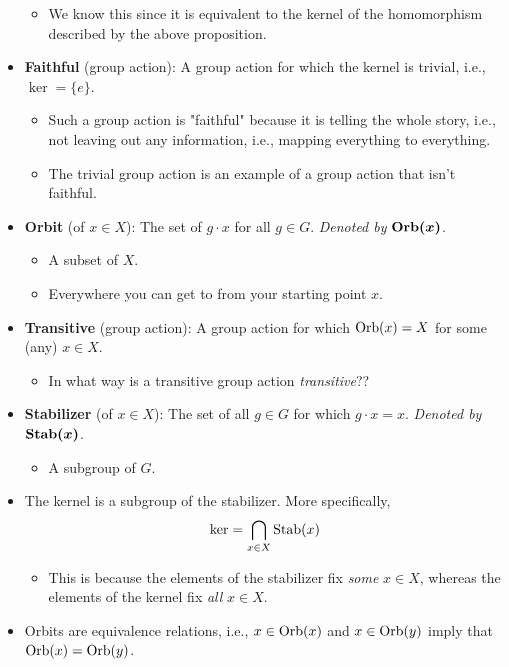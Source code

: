 \documentclass[../notes.tex]{subfiles}
\begin{document}
\begin{itemize}
\begin{itemize}
        \item We know this since it is equivalent to the kernel of the homomorphism described by the above proposition.
    \end{itemize}
    \item \textbf{Faithful} (group action): A group action for which the kernel is trivial, i.e., $\ker=\{e\}$.
    \begin{itemize}
        \item Such a group action is "faithful" because it is telling the whole story, i.e., not leaving out any information, i.e., mapping everything to everything.
        \item The trivial group action is an example of a group action that isn't faithful.
    \end{itemize}
    \item \textbf{Orbit} (of $x\in X$): The set of $g\cdot x$ for all $g\in G$. \emph{Denoted by} $\bm{\Orb(x)}$.
    \begin{itemize}
        \item A subset of $X$.
        \item Everywhere you can get to from your starting point $x$.
    \end{itemize}
    \item \textbf{Transitive} (group action): A group action for which $\operatorname{Orb}(x)=X$ for some (any) $x\in X$.
    \begin{itemize}
        \item In what way is a transitive group action \emph{transitive}??
    \end{itemize}
    \item \textbf{Stabilizer} (of $x\in X$): The set of all $g\in G$ for which $g\cdot x=x$. \emph{Denoted by} $\bm{\Stab(x)}$.
    \begin{itemize}
        \item A subgroup of $G$.
    \end{itemize}
    \item The kernel is a subgroup of the stabilizer. More specifically,
    \begin{equation*}
        \ker = \bigcap_{x\in X}\operatorname{Stab}(x)
    \end{equation*}
    \begin{itemize}
        \item This is because the elements of the stabilizer fix \emph{some} $x\in X$, whereas the elements of the kernel fix \emph{all} $x\in X$.
    \end{itemize}
    \item Orbits are equivalence relations, i.e., $x\in\operatorname{Orb}(x)$ and $x\in\operatorname{Orb}(y)$ imply that $\operatorname{Orb}(x)=\operatorname{Orb}(y)$.

\end{itemize}
\end{document}
